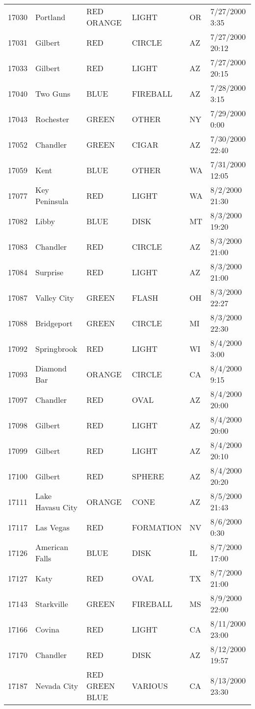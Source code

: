 \begin{tabular}{llllll}
17030 & Portland & RED ORANGE & LIGHT & OR & 7/27/2000 3:35 \\
17031 & Gilbert & RED & CIRCLE & AZ & 7/27/2000 20:12 \\
17033 & Gilbert & RED & LIGHT & AZ & 7/27/2000 20:15 \\
17040 & Two Guns & BLUE & FIREBALL & AZ & 7/28/2000 3:15 \\
17043 & Rochester & GREEN & OTHER & NY & 7/29/2000 0:00 \\
17052 & Chandler & GREEN & CIGAR & AZ & 7/30/2000 22:40 \\
17059 & Kent & BLUE & OTHER & WA & 7/31/2000 12:05 \\
17077 & Key Peninsula & RED & LIGHT & WA & 8/2/2000 21:30 \\
17082 & Libby & BLUE & DISK & MT & 8/3/2000 19:20 \\
17083 & Chandler & RED & CIRCLE & AZ & 8/3/2000 21:00 \\
17084 & Surprise & RED & LIGHT & AZ & 8/3/2000 21:00 \\
17087 & Valley City & GREEN & FLASH & OH & 8/3/2000 22:27 \\
17088 & Bridgeport & GREEN & CIRCLE & MI & 8/3/2000 22:30 \\
17092 & Springbrook & RED & LIGHT & WI & 8/4/2000 3:00 \\
17093 & Diamond Bar & ORANGE & CIRCLE & CA & 8/4/2000 9:15 \\
17097 & Chandler & RED & OVAL & AZ & 8/4/2000 20:00 \\
17098 & Gilbert & RED & LIGHT & AZ & 8/4/2000 20:00 \\
17099 & Gilbert & RED & LIGHT & AZ & 8/4/2000 20:10 \\
17100 & Gilbert & RED & SPHERE & AZ & 8/4/2000 20:20 \\
17111 & Lake Havasu City & ORANGE & CONE & AZ & 8/5/2000 21:43 \\
17117 & Las Vegas & RED & FORMATION & NV & 8/6/2000 0:30 \\
17126 & American Falls & BLUE & DISK & IL & 8/7/2000 17:00 \\
17127 & Katy & RED & OVAL & TX & 8/7/2000 21:00 \\
17143 & Starkville & GREEN & FIREBALL & MS & 8/9/2000 22:00 \\
17166 & Covina & RED & LIGHT & CA & 8/11/2000 23:00 \\
17170 & Chandler & RED & DISK & AZ & 8/12/2000 19:57 \\
17187 & Nevada City & RED GREEN BLUE & VARIOUS & CA & 8/13/2000 23:30 \\

\end{tabular}

